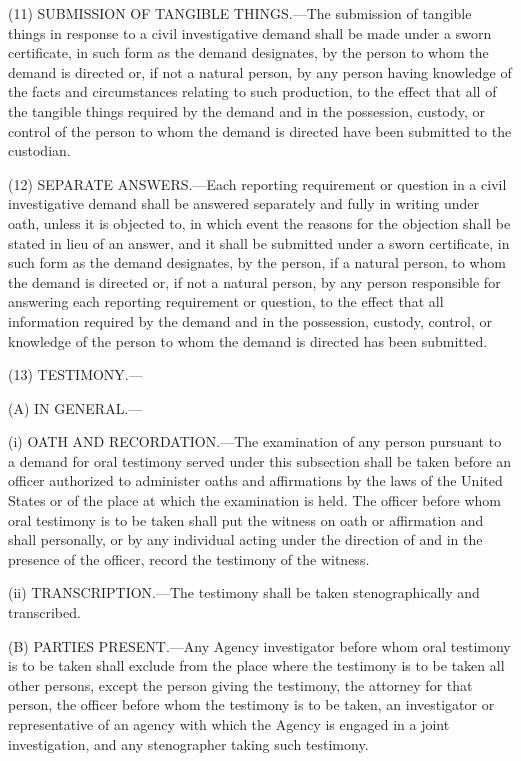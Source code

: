 (11) SUBMISSION OF TANGIBLE THINGS.—The submission of tangible things in response to a civil investigative demand shall be made under a sworn certificate, in such form as the demand designates, by the person to whom the demand is directed or, if not a natural person, by any person having knowledge of the facts and circumstances relating to such production, to the effect that all of the tangible things required by the demand and in the possession, custody, or control of the person to whom the demand is directed have been submitted to the custodian.

(12) SEPARATE ANSWERS.—Each reporting requirement or question in a civil investigative demand shall be answered separately and fully in writing under oath, unless it is objected to, in which event the reasons for the objection shall be stated in lieu of an answer, and it shall be submitted under a sworn certificate, in such form as the demand designates, by the person, if a natural person, to whom the demand is directed or, if not a natural person, by any person responsible for answering each reporting requirement or question, to the effect that all information required by the demand and in the possession, custody, control, or knowledge of the person to whom the demand is directed has been submitted.

(13) TESTIMONY.—

(A) IN GENERAL.—

(i) OATH AND RECORDATION.—The examination of any person pursuant to a demand for oral testimony served under this subsection shall be taken before an officer authorized to administer oaths and affirmations by the laws of the United States or of the place at which the examination is held. The officer before whom oral testimony is to be taken shall put the witness on oath or affirmation and shall personally, or by any individual acting under the direction of and in the presence of the officer, record the testimony of the witness.

(ii) TRANSCRIPTION.—The testimony shall be taken stenographically and transcribed.

(B) PARTIES PRESENT.—Any Agency investigator before whom oral testimony is to be taken shall exclude from the place where the testimony is to be taken all other persons, except the person giving the testimony, the attorney for that person, the officer before whom the testimony is to be taken, an investigator or representative of an agency with which the Agency is engaged in a joint investigation, and any stenographer taking such testimony.

